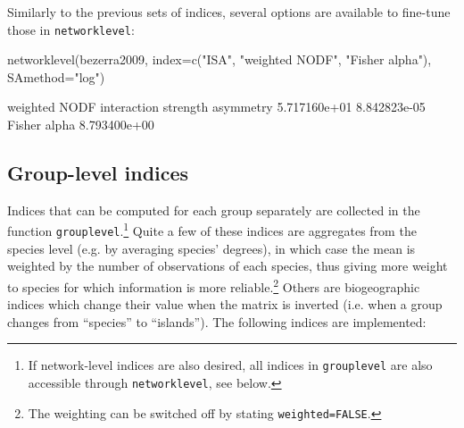 \documentclass[a4paper, 11pt]{article}\usepackage[]{graphicx}\usepackage[]{color}
\makeatletter
\newcommand{\indR}[1]{\texttt{#1}\index{#1@\texttt{#1}}}   %
\makeatother
\begin{document}
\noindent Similarly to the previous sets of indices, several options are available to fine-tune those in \texttt{networklevel}:
\begin{Schunk}
\begin{Sinput}
networklevel(bezerra2009, index=c("ISA", "weighted NODF", "Fisher alpha"), SAmethod="log")
\end{Sinput}
\begin{Soutput}
                 weighted NODF interaction strength asymmetry 
                  5.717160e+01                   8.842823e-05 
                  Fisher alpha 
                  8.793400e+00 
\end{Soutput}
\end{Schunk}





\subsection{Group-level indices}\label{grouplevel}
Indices that can be computed for each group separately are collected in the function \indR{grouplevel}.\footnote{If network-level indices are also desired, all indices in \texttt{grouplevel} are also accessible through \texttt{networklevel}, see below.} Quite a few of these indices are aggregates from the species level (e.g. by averaging species' degrees), in which case the mean is weighted by the number of observations of each species, thus giving more weight to species for which information is more reliable.\footnote{The weighting can be switched off by stating \texttt{weighted=FALSE}.} Others are biogeographic indices which change their value when the matrix is inverted (i.e. when a group changes from ``species'' to ``islands''). The following indices are implemented:
\end{document}
